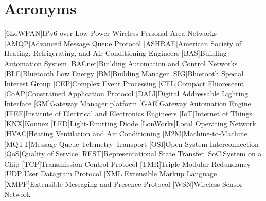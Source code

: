 \chapter{Acronyms}

\footnotesize
\SingleSpacing

\begin{multicols}{2}
\begin{acronym}[AAAAAA]
	[6LoWPAN]{IPv6 over Low-Power Wireless Personal Area Networks}
	[AMQP]{Advanced Message Queue Protocol}
	[ASHRAE]{American Society of Heating, Refrigerating, and Air-Conditioning Engineers}
	[BAS]{Building Automation System}
	[BACnet]{Building Automation and Control Networks}
	[BLE]{Bluetooth Low Energy}
	[BM]{Building Manager}
	[SIG]{Bluetooth Special Interest Group}
	[CEP]{Complex Event Processing}
	[CFL]{Compact Fluorescent}
	[CoAP]{Constrained Application Protocol}
	[DALI]{Digital Addressable Lighting Interface}
	[GM]{Gateway Manager platform}
	[GAE]{Gateway Automation Engine}
	[IEEE]{Institute of Electrical and Electronics Engineers}
	[IoT]{Internet of Things}
	[KNX]{Konnex}
	[LED]{Light-Emitting Diode}
	[LonWorks]{Local Operating Network}
	[HVAC]{Heating Ventilation and Air Conditioning}
	[M2M]{Machine-to-Machine}
	[MQTT]{Message Queue Telemetry Transport}
	[OSI]{Open System Interconnection}
	[QoS]{Quality of Service}
	[REST]{Representational State Transfer}
	[SoC]{System on a Chip}
	[TCP]{Transmission Control Protocol}
	[TMR]{Triple Modular Redundancy}
	[UDP]{User Datagram Protocol}
	[XML]{Extensible Markup Language}
	[XMPP]{Extensible Messaging and Presence Protocol}
	[WSN]{Wireless Sensor Network}
	


\end{acronym}
\end{multicols}

